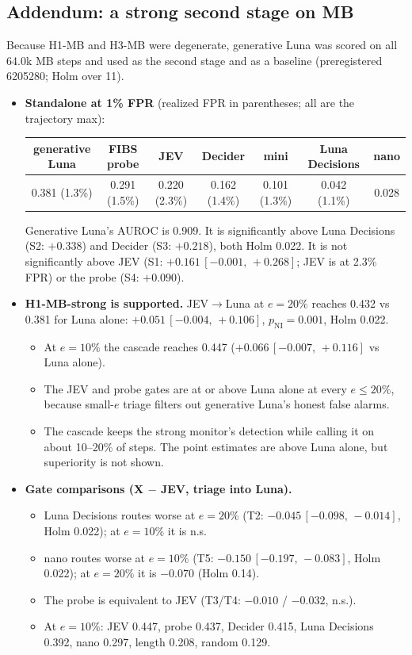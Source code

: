 \documentclass[11pt]{article}
\newcommand{\ci}[2]{\,[#1,\,#2]}
\begin{document}
\subsection{Addendum: a strong second stage on MB}\label{sec:mbstrong}
Because H1-MB and H3-MB were degenerate, generative Luna was scored on all 64.0k MB steps and used as the second stage and as a baseline (preregistered 6205280; Holm over 11).
\begin{itemize}
\item \textbf{Standalone at 1\% FPR} (realized FPR in parentheses; all are the trajectory max):
\begin{center}\footnotesize
\begin{tabular}{@{}ccccccc@{}}
\toprule
generative Luna & FIBS probe & JEV & Decider & mini & Luna Decisions & nano\\
\midrule
0.381 (1.3\%) & 0.291 (1.5\%) & 0.220 (2.3\%) & 0.162 (1.4\%) & 0.101 (1.3\%) & 0.042 (1.1\%) & 0.028\\
\bottomrule
\end{tabular}
\end{center}
Generative Luna's AUROC is 0.909. It is significantly above Luna Decisions (S2: $+0.338$) and Decider (S3: $+0.218$), both Holm 0.022. It is not significantly above JEV (S1: $+0.161\ci{-0.001}{+0.268}$; JEV is at 2.3\% FPR) or the probe (S4: $+0.090$).
\item \textbf{H1-MB-strong is supported.} JEV$\to$Luna at $e=20\%$ reaches 0.432 vs 0.381 for Luna alone: $+0.051\ci{-0.004}{+0.106}$, $p_\text{NI}=0.001$, Holm 0.022.
  \begin{itemize}
  \item At $e=10\%$ the cascade reaches 0.447 ($+0.066\ci{-0.007}{+0.116}$ vs Luna alone).
  \item The JEV and probe gates are at or above Luna alone at every $e\le20\%$, because small-$e$ triage filters out generative Luna's honest false alarms.
  \item The cascade keeps the strong monitor's detection while calling it on about 10--20\% of steps. The point estimates are above Luna alone, but superiority is not shown.
  \end{itemize}
\item \textbf{Gate comparisons (X $-$ JEV, triage into Luna).}
  \begin{itemize}
  \item Luna Decisions routes worse at $e=20\%$ (T2: $-0.045\ci{-0.098}{-0.014}$, Holm 0.022); at $e=10\%$ it is n.s.
  \item nano routes worse at $e=10\%$ (T5: $-0.150\ci{-0.197}{-0.083}$, Holm 0.022); at $e=20\%$ it is $-0.070$ (Holm 0.14).
  \item The probe is equivalent to JEV (T3/T4: $-0.010$ / $-0.032$, n.s.).
  \item At $e=10\%$: JEV 0.447, probe 0.437, Decider 0.415, Luna Decisions 0.392, nano 0.297, length 0.208, random 0.129.
  \end{itemize}
\end{itemize}
\end{document}
